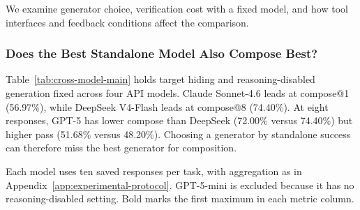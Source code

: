 We examine generator choice, verification cost with a fixed model, and
how tool interfaces and feedback conditions affect the comparison.

\subsubsection{Does the Best Standalone Model Also Compose Best?}
\label{app:rq3}
\label{app:reasoning-leakage}

Table~\ref{tab:cross-model-main} holds target hiding and reasoning-disabled
generation fixed across four API models.  Claude Sonnet-4.6 leads at
compose@1 (56.97\%), while DeepSeek V4-Flash leads at compose@8 (74.40\%).
At eight responses, GPT-5 has lower compose than DeepSeek (72.00\% versus
74.40\%) but higher pass (51.68\% versus 48.20\%).  Choosing a generator
by standalone success can therefore miss the best generator for composition.

Each model uses ten saved responses per task, with aggregation as in
Appendix~\ref{app:experimental-protocol}. GPT-5-mini is excluded because it
has no reasoning-disabled setting. Bold marks the first maximum in each
metric column.

